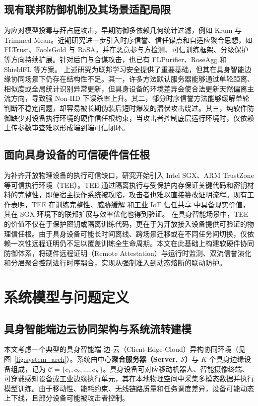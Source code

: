 \documentclass[11pt, a4paper, UTF8, fontset=fandol]{ctexart}
\begin{document}
\subsection{现有联邦防御机制及其场景适配局限}
为应对模型投毒与拜占庭攻击，早期防御多依赖几何统计过滤，例如 Krum\cite{blanchard2017krum} 与 Trimmed Mean\cite{yin2018byzantine}。近期研究进一步引入时序信誉、信任锚点和自适应聚合思想，如 FLTrust\cite{cao2021fltrust}、FoolsGold\cite{fung2020foolsgold} 与 RaSA\cite{wang2025rasa}，并在恶意参与方检测\cite{dou2025toward}、可信训练框架\cite{lu2025tmt}、分级保护\cite{wang2024federated} 等方向持续扩展。针对后门与合谋攻击，也已有 FLPurifier\cite{flpurifier}、RoseAgg\cite{roseagg} 和 ShieldFL\cite{shieldfl} 等方案。
上述研究为联邦学习安全提供了重要基础，但其在具身智能边缘协同场景下仍存在结构性不足。其一，许多方法默认服务器能够通过单轮距离、相似度或全局统计识别异常更新，但具身设备的环境差异会使合法更新天然偏离主流方向，导致强 Non-IID 下误杀率上升。其二，部分时序信誉方法能够缓解单轮判断不稳定问题，却容易被长期伪装后短时爆发的潜伏攻击绕过。其三，纯软件防御缺少对设备执行环境的硬件信任根约束，当攻击者控制底层运行环境时，仅依赖上传参数审查难以形成端到端可信闭环。

\subsection{面向具身设备的可信硬件信任根}
为补齐开放物理设备的执行可信缺口，研究开始引入 Intel SGX、ARM TrustZone 等可信执行环境（TEE）。TEE 通过隔离执行与受保护内存保证关键代码和密钥材料的完整性，即便宿主操作系统被攻陷，攻击者也难以直接篡改证明流程\cite{zhang2025rppfl,liao2024verifiable}。现有工作表明，TEE 在训练完整性\cite{r1_tee_integrity}、威胁缓解\cite{r5_tee_mitigating} 和工业 IoT 信任共享\cite{r12_iot_tee} 中具备现实价值，其在 SGX 环境下的联邦扩展与效率优化也得到验证\cite{xu2021distributed,yan2024efficient}。
在具身智能场景中，TEE 的价值不仅在于保护密钥或隔离训练代码，更在于为开放接入设备提供可验证的物理信任根。由于具身设备可能长时间离线、跨场景迁移或在不同任务间切换，仅依赖一次性远程证明仍不足以覆盖训练全生命周期。本文在此基础上构建软硬件协同防御体系，将硬件远程证明（Remote Attestation）与运行时监测、双流信誉演化和分层聚合控制进行时序耦合，实现从强制准入到动态熔断的联动防护。


\section{系统模型与问题定义}

\subsection{具身智能端边云协同架构与系统流转建模}
本文考虑一个典型的具身智能端-边-云（Client-Edge-Cloud）异构协同环境（见图~\ref{fig:system_arch}）。系统由中心\textbf{聚合服务器（Server, $\mathcal{S}$）}与 $K$ 个具身边缘设备组成，记为 $\mathcal{C}=\{c_1, c_2, \dots, c_K\}$。具身设备可对应移动机器人、智能摄像终端、可穿戴感知设备或工业边缘执行单元，其在本地物理空间中采集多模态数据并执行模型训练。由于移动性、能耗约束、无线链路质量和任务调度差异，设备可能动态上下线，且部分设备可能被攻击者控制。
\end{document}
